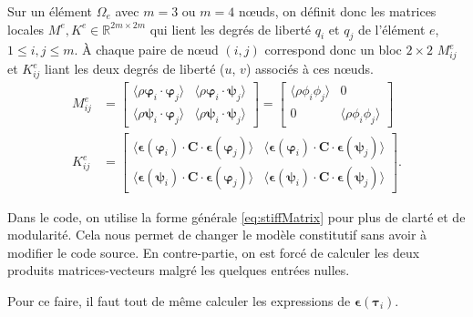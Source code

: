 \documentclass[12pt]{article}
\newcommand{\strain}{\boldsymbol{\epsilon}}
\newcommand{\shapeu}{\boldsymbol{\varphi}}
\newcommand{\shapev}{\boldsymbol{\psi}}
\newcommand{\shapef}{\boldsymbol{\tau}}
\begin{document}
Sur un élément $\Omega_e$ avec $m=3$ ou $m=4$ n\oe uds, on définit donc les 
matrices locales $M^e, K^e \in \mathbb{R}^{2m \times 2m}$ qui lient les degrés 
de liberté $q_i$ et $q_j$ de l'élément $e$, $1\leq i,j\leq m$. 
À chaque paire de n\oe ud $(i,j)$ correspond donc un bloc 
$2 \times 2$ $M_{ij}^e$ et $K_{ij}^e$ liant les deux degrés de liberté 
($u$, $v$) associés à ces n\oe uds.
\begin{align}
    M_{ij}^e &= 
    \begin{bmatrix}
        \langle \rho \shapeu_i \cdot \shapeu_j \rangle &
        \langle \rho \shapeu_i \cdot \shapev_j \rangle \\
        \langle \rho \shapev_i \cdot \shapeu_j \rangle &
        \langle \rho \shapev_i \cdot \shapev_j \rangle
    \end{bmatrix}
    = 
    \begin{bmatrix}
        \langle\rho \phi_i \phi_j\rangle & 0\\
        0 & \langle\rho \phi_i \phi_j\rangle
    \end{bmatrix} \label{eq:massMatrix}\\
    K_{ij}^e &= 
    \begin{bmatrix}
        \langle\strain(\shapeu_i) \cdot \mathbf{C} \cdot \strain(\shapeu_j)\rangle &
        \langle\strain(\shapeu_i) \cdot \mathbf{C} \cdot \strain(\shapev_j)\rangle\\
        \langle\strain(\shapev_i) \cdot \mathbf{C} \cdot \strain(\shapeu_j)\rangle &
        \langle\strain(\shapev_i) \cdot \mathbf{C} \cdot \strain(\shapev_j)\rangle
    \end{bmatrix}.\label{eq:stiffMatrix}
\end{align}



Dans le code, on utilise la forme générale \eqref{eq:stiffMatrix} pour plus 
de clarté et de modularité. 
Cela nous permet de changer le modèle constitutif sans avoir à 
modifier le code source. En contre-partie, on est forcé de calculer les deux
produits matrices-vecteurs malgré les quelques entrées nulles.

Pour ce faire, il faut tout de même calculer les expressions de 
$\strain(\shapef_i)$.
\end{document}

